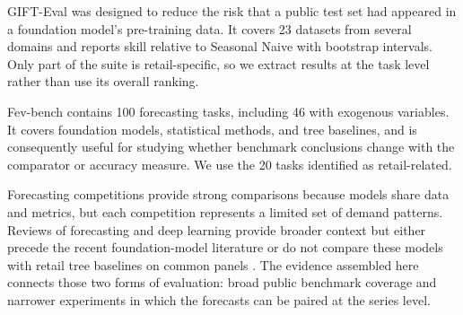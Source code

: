 GIFT-Eval \citep{aksu2024gift} was designed to reduce the risk that a public
test set had appeared in a foundation model's pre-training data. It covers 23
datasets from several domains and reports skill relative to Seasonal Naive
with bootstrap intervals. Only part of the suite is retail-specific, so we
extract results at the task level rather than use its overall ranking.

Fev-bench \citep{shchur2025fevbench} contains 100 forecasting tasks, including
46 with exogenous variables. It covers foundation models, statistical
methods, and tree baselines, and is consequently useful for studying whether
benchmark conclusions change with the comparator or accuracy measure. We use
the 20 tasks identified as retail-related.

Forecasting competitions provide strong comparisons because models share data
and metrics, but each competition represents a limited set of demand patterns.
Reviews of forecasting and deep learning provide broader context but either
precede the recent foundation-model literature or do not compare these models
with retail tree baselines on common panels \citep{lim2021tft}. The evidence
assembled here connects those two forms of evaluation: broad public benchmark
coverage and narrower experiments in which the forecasts can be paired at the
series level.
